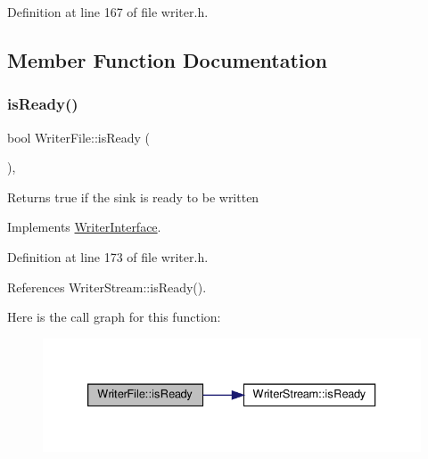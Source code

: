Definition at line 167 of file writer.\+h.



\subsection{Member Function Documentation}
\mbox{\label{classWriterFile_aaa16229f58daf8b74fbe8a59c9b1b166}} 
\subsubsection{\texorpdfstring{is\+Ready()}{isReady()}}
{\footnotesize\ttfamily bool Writer\+File\+::is\+Ready (\begin{DoxyParamCaption}{ }\end{DoxyParamCaption})\hspace{0.3cm}{\ttfamily [inline]}, {\ttfamily [virtual]}}

\begin{DoxyReturn}{Returns}
true if the sink is ready to be written 
\end{DoxyReturn}


Implements \hyperlink{classWriterInterface_ada0c58dbea3bc216a1a687b070f2a924}{Writer\+Interface}.



Definition at line 173 of file writer.\+h.



References Writer\+Stream\+::is\+Ready().

Here is the call graph for this function\+:
\nopagebreak
\begin{figure}[H]
\begin{center}
\leavevmode
\includegraphics[width=333pt]{classWriterFile_aaa16229f58daf8b74fbe8a59c9b1b166_cgraph}
\end{center}
\end{figure}
\mbox{\label{classWriterFile_a538dd7bd3be5c0f3b930f215bf9f6ca7}} 
